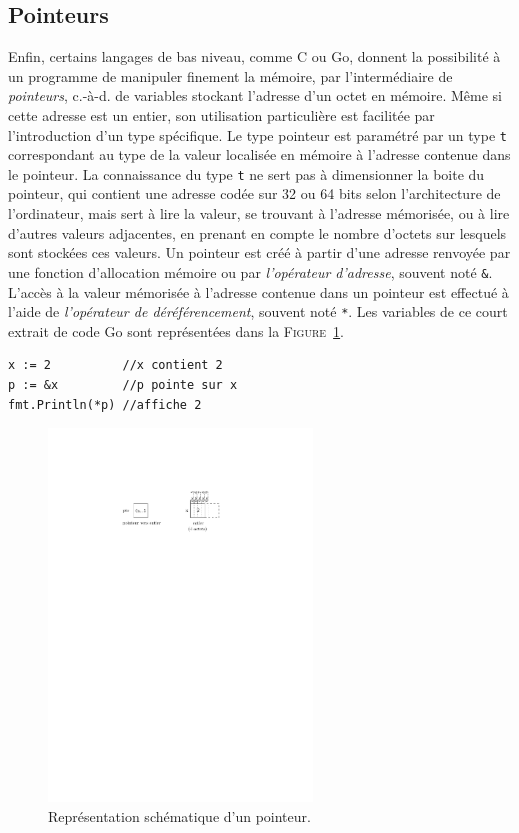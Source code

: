 \documentclass[a4paper,francais]{insalyon}
\newcommand{\cad}{c.-à-d.}
\begin{document}
\subsection{Pointeurs}

Enfin, certains langages de bas niveau, comme C ou Go, donnent la possibilité à un programme de manipuler finement la mémoire, par l'intermédiaire de \emph{pointeurs}, {\cad} de variables stockant l'adresse d'un octet en mémoire. Même si cette adresse est un entier, son utilisation particulière est facilitée par l'introduction d'un type spécifique. Le type pointeur est paramétré par un type \texttt{t} correspondant au type de la valeur localisée en mémoire à l'adresse contenue dans le pointeur. La connaissance du type \texttt{t} ne sert pas à dimensionner la boite du pointeur, qui contient une adresse codée sur 32 ou 64 bits selon l'architecture de l'ordinateur, mais sert à lire la valeur, se trouvant à l'adresse mémorisée, ou à lire d'autres valeurs adjacentes, en prenant en compte le nombre d'octets sur lesquels sont stockées ces valeurs. Un pointeur est créé à partir d'une adresse renvoyée par une fonction d'allocation mémoire ou par \emph{l'opérateur d'adresse}, souvent noté \verb!&!. L'accès à la valeur mémorisée à l'adresse contenue dans un pointeur est effectué à l'aide de \emph{l'opérateur de déréférencement}, souvent noté \verb!*!. Les variables de ce court extrait de code Go sont représentées dans la \textsc{Figure}~\ref{fig:pointeur}.  
\begin{verbatim}
x := 2          //x contient 2
p := &x         //p pointe sur x
fmt.Println(*p) //affiche 2 
\end{verbatim}

\begin{figure}[htbp]
  \centering
  \includegraphics[width=7cm]{pointeur}
  \caption{Représentation schématique d'un pointeur.}  
  \label{fig:pointeur}
\end{figure}
\end{document}
